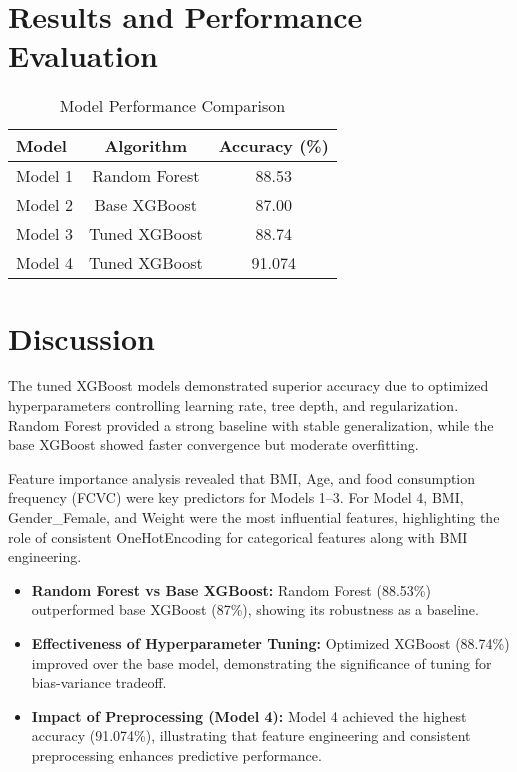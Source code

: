 \documentclass[12pt,a4paper]{report}
\begin{document}
\chapter{Results and Performance Evaluation}

\begin{table}[H]
\centering
\caption{Model Performance Comparison}
\begin{tabular}{lcc}
\toprule
\textbf{Model} & \textbf{Algorithm} & \textbf{Accuracy (\%)} \\
\midrule
Model 1 & Random Forest & 88.53 \\
Model 2 & Base XGBoost & 87.00 \\
Model 3 & Tuned XGBoost & 88.74 \\
Model 4 & Tuned XGBoost & 91.074 \\
\bottomrule
\end{tabular}
\end{table}

\chapter{Discussion}
The tuned XGBoost models demonstrated superior accuracy due to optimized hyperparameters controlling learning rate, tree depth, and regularization. Random Forest provided a strong baseline with stable generalization, while the base XGBoost showed faster convergence but moderate overfitting.

Feature importance analysis revealed that BMI, Age, and food consumption frequency (FCVC) were key predictors for Models 1–3. For Model 4, BMI, Gender\_Female, and Weight were the most influential features, highlighting the role of consistent OneHotEncoding for categorical features along with BMI engineering.

\begin{itemize}
    \item \textbf{Random Forest vs Base XGBoost:} Random Forest (88.53\%) outperformed base XGBoost (87\%), showing its robustness as a baseline.
    \item \textbf{Effectiveness of Hyperparameter Tuning:} Optimized XGBoost (88.74\%) improved over the base model, demonstrating the significance of tuning for bias-variance tradeoff.
    \item \textbf{Impact of Preprocessing (Model 4):} Model 4 achieved the highest accuracy (91.074\%), illustrating that feature engineering and consistent preprocessing enhances predictive performance.
\end{itemize}

\end{document}

